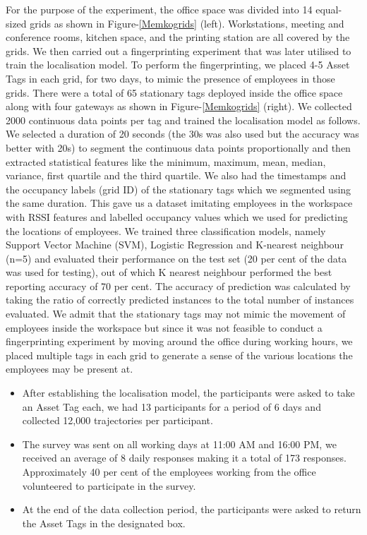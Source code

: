 \documentclass[acmtog]{acmart}
\begin{document}
For the purpose of the experiment, the office space was divided into 14 equal-sized grids as shown in Figure-\ref{Memkogrids} (left). Workstations, meeting and conference rooms, kitchen space, and the printing station are all covered by the grids. We then carried out a fingerprinting experiment that was later utilised to train the localisation model. To perform the fingerprinting, we placed 4-5 Asset Tags in each grid, for two days, to mimic the presence of employees in those grids.  There were a total of 65 stationary tags deployed inside the office space along with four gateways as shown in Figure-\ref{Memkogrids} (right). We collected 2000 continuous data points per tag and trained the localisation model as follows. We selected a duration of 20 seconds (the 30s was also used but the accuracy was better with 20s) to segment the continuous data points proportionally and then extracted statistical features like the minimum, maximum, mean, median, variance, first quartile and the third quartile. We also had the timestamps and the occupancy labels (grid ID) of the stationary tags which we segmented using the same duration. This gave us a dataset imitating employees in the workspace with RSSI features and labelled occupancy values which we used for predicting the locations of employees. We trained three classification models, namely Support Vector Machine (SVM), Logistic Regression and K-nearest neighbour (n=5) and evaluated their performance on the test set (20 per cent of the data was used for testing), out of which K nearest neighbour performed the best reporting accuracy of 70 per cent. The accuracy of prediction was calculated by taking the ratio of correctly predicted instances to the total number of instances evaluated. We admit that the stationary tags may not mimic the movement of employees inside the workspace but since it was not feasible to conduct a fingerprinting experiment by moving around the office during working hours, we placed multiple tags in each grid to generate a sense of the various locations the employees may be present at. 
\begin{itemize}
    \item After establishing the localisation model, the participants were asked to take an Asset Tag each, we had 13 participants for a period of 6 days and collected 12,000 trajectories per participant. 
    \item The survey was sent on all working days at 11:00 AM and 16:00 PM, we received an average of 8 daily responses making it a total of 173 responses. Approximately 40 per cent of the employees working from the office volunteered to participate in the survey. 
    \item At the end of the data collection period, the participants were asked to return the Asset Tags in the designated box. 
\end{itemize}
\end{document}
